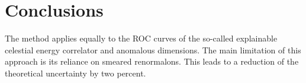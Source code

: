 \section{Conclusions}\label{sec:conclusions}

The method applies equally to the ROC curves of the so-called
explainable celestial energy correlator and anomalous dimensions. The
main limitation of this approach is its reliance on smeared renormalons.
This leads to a reduction of the theoretical uncertainty by two percent.

